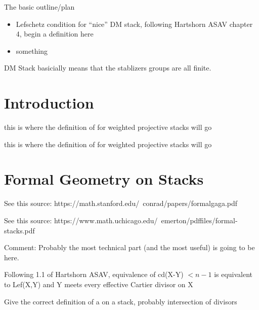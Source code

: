 \documentclass{article}
\begin{document}
    The basic outline/plan
    \begin{itemize}
        \item Lefschetz condition for ``nice'' DM stack, following Hartshorn ASAV chapter 4, begin a definition here
        \item something
    \end{itemize}    

    DM Stack basicially means that the stablizers groups are all finite.

    \section{Introduction}

    \begin{definition}
        \label{def:Lef}
        this is where the definition of  for weighted projective stacks will go
    \end{definition}

    \begin{definition}
        \label{def:Leff}
        this is where the definition of  for weighted projective stacks will go
    \end{definition}

    \section{Formal Geometry on Stacks}
    See this source: https://math.stanford.edu/~conrad/papers/formalgaga.pdf

    See this source: https://www.math.uchicago.edu/~emerton/pdffiles/formal-stacks.pdf

    Comment: Probably the most technical part (and the most useful) is going to be here.

    \begin{definition}
    \end{definition}

    \begin{proposition}
        Following 1.1 of Hartshorn ASAV, equivalence of cd(X-Y) $< n-1$ is equivalent to Lef(X,Y) and Y meets every 
        effective Cartier divisor on X
    \end{proposition}

    \begin{definition}
        \label{def:completeIntersections}
        Give the correct definition of a  on a stack, probably intersection of divisors
    \end{definition}
\end{document}
